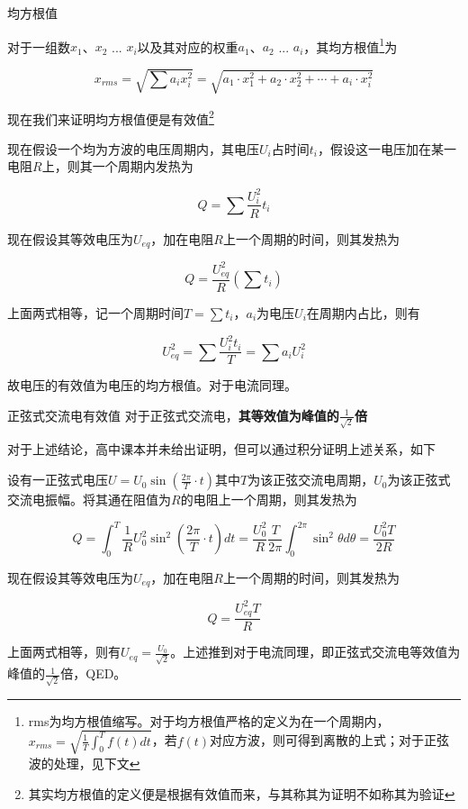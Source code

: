 \begin{defi}{均方根值}{}

对于一组数$x_1$、$x_2$ ... $x_i$以及其对应的权重$a_1$、$a_2$ ... $a_i$，其均方根值\footnote{rms为均方根值缩写。对于均方根值严格的定义为在一个周期内，$x_{rms} = \sqrt{\frac{1}{T} \int_0^T f(t) dt}$，若$f(t)$对应方波，则可得到离散的上式；对于正弦波的处理，见下文}为

$$x_{rms} = \sqrt{\sum a_i x_i^2} = \sqrt{a_1 \cdot x_1^2 + a_2 \cdot x_2^2 + \cdots + a_i \cdot x_i^2}$$

\end{defi}

现在我们来证明均方根值便是有效值\footnote{其实均方根值的定义便是根据有效值而来，与其称其为证明不如称其为验证}

现在假设一个均为方波的电压周期内，其电压$U_i$占时间$t_i$，假设这一电压加在某一电阻$R$上，则其一个周期内发热为

$$ Q = \sum \frac{U_i^2}{R} t_i $$

现在假设其等效电压为$U_{eq}$，加在电阻$R$上一个周期的时间，则其发热为

$$ Q = \frac{U_{eq}^2}{R} (\sum t_i)$$

上面两式相等，记一个周期时间$T = \sum t_i $，$a_i$为电压$U_i$在周期内占比，则有

$$U_{eq}^2 = \sum \frac{U_i^2 t_i}{T} = \sum a_i U_i^2$$

故电压的有效值为电压的均方根值。对于电流同理。

\begin{theo}{正弦式交流电有效值}{}
对于正弦式交流电，\textbf{其等效值为峰值的$\frac{1}{\sqrt{2}}$倍}
\end{theo}

对于上述结论，高中课本并未给出证明，但可以通过积分证明上述关系，如下

设有一正弦式电压$U = U_0 \sin (\frac{2 \pi}{T} \cdot t )$其中$T$为该正弦交流电周期，$U_0$为该正弦式交流电振幅。将其通在阻值为$R$的电阻上一个周期，则其发热为

$$Q = \int_0^T \frac{1}{R} U_0^2 \sin^2 (\frac{2 \pi}{T} \cdot t ) dt = \frac{U_0^2}{R} \frac{T}{2 \pi} \int_0^{2 \pi} \sin^2 \theta d \theta = \frac{U_0^2 T}{2R}$$

现在假设其等效电压为$U_{eq}$，加在电阻$R$上一个周期的时间，则其发热为

$$ Q = \frac{U_{eq}^2 T}{R} $$

上面两式相等，则有$U_{eq} = \frac{U_0}{\sqrt{2}}$。上述推到对于电流同理，即正弦式交流电等效值为峰值的$\frac{1}{\sqrt{2}}$倍，QED。

